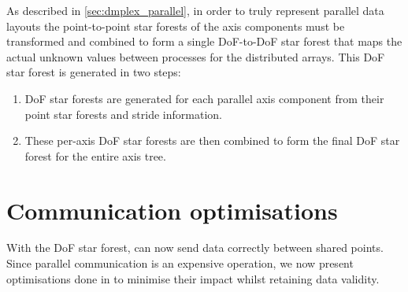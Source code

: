 \documentclass[thesis]{subfiles}
\begin{document}
%
%
%

As described in \cref{sec:dmplex_parallel}, in order to truly represent parallel data layouts the point-to-point star forests of the axis components must be transformed and combined to form a single DoF-to-DoF star forest that maps the actual unknown values between processes for the distributed arrays.
This DoF star forest is generated in two steps:
\begin{enumerate}
  \item
    DoF star forests are generated for each parallel axis component from their point star forests and stride information.
  \item
    These per-axis DoF star forests are then combined to form the final DoF star forest for the entire axis tree.
\end{enumerate}

\section{Communication optimisations}
\label{sec:communication_optimisations}

With the DoF star forest,   can now send data correctly between shared points.
Since parallel communication is an expensive operation, we now present optimisations done in  to minimise their impact whilst retaining data validity.
\end{document}
